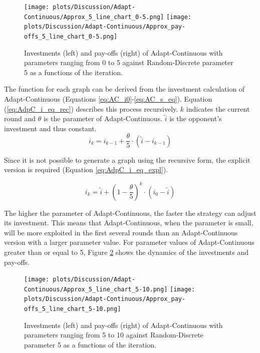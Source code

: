 \documentclass[11pt]{article}
\begin{document}
	\begin{figure}[h!]
		\centering
		\texttt{[image: plots/Discussion/Adapt-Continuous/Approx\_5\_line\_chart\_0-5.png]}
		\texttt{[image: plots/Discussion/Adapt-Continuous/Approx\_pay-offs\_5\_line\_chart\_0-5.png]}
		\caption{Investments (left) and pay-offs (right) of Adapt-Continuous with parameters ranging from 0 to 5 against Random-Discrete parameter 5 as a functions of the iteration.}
		\label{fig:AC_approx_invetm_and_payoffs_0-5}
	\end{figure}
	
	\noindent
	The function for each graph can be derived from the investment calculation of Adapt-Continuous (Equations \ref{eq:AC_i0}-\ref{eq:AC_s_eq}).
	Equation (\ref{eq:AdpC_i_eq_rec}) describes this process recursively.
	$k$ indicates the current round and $\theta$ is the parameter of Adapt-Continuous.
	$\tilde{i}$ is the opponent's investment and thus constant.
	\begin{equation}
		i_k = i_{k-1} + \frac{\theta}{5} \cdot (\tilde{i} - i_{k-1})
		\label{eq:AdpC_i_eq_rec}
	\end{equation}

	\noindent
	Since it is not possible to generate a graph using the recursive form, the explicit version is required (Equation \ref{eq:AdpC_i_eq_expl}).

	\begin{equation}
		i_k = \tilde{i} + (1 - \frac{\theta}{5})^k \cdot (i_0 - \tilde{i})
		\label{eq:AdpC_i_eq_expl}
	\end{equation}
	
	\noindent
	The higher the parameter of Adapt-Continuous, the faster the strategy can adjust its investment.
	This means that Adapt-Continuous, when the parameter is small, will be more exploited in the first several rounds than an Adapt-Continuous version with a larger parameter value.
	For parameter values of Adapt-Continuous greater than or equal to 5, Figure \ref{fig:AC_approx_invetm_and_payoffs_5-10} shows the dynamics of the investments and pay-offs.

	\begin{figure}[!h]
		\centering
		\texttt{[image: plots/Discussion/Adapt-Continuous/Approx\_5\_line\_chart\_5-10.png]}
		\texttt{[image: plots/Discussion/Adapt-Continuous/Approx\_pay-offs\_5\_line\_chart\_5-10.png]}
		\caption{Investments (left) and pay-offs (right) of Adapt-Continuous with parameters ranging from 5 to 10 against Random-Discrete parameter 5 as a functions of the iteration.}
		\label{fig:AC_approx_invetm_and_payoffs_5-10}
	\end{figure}
	
\end{document}
